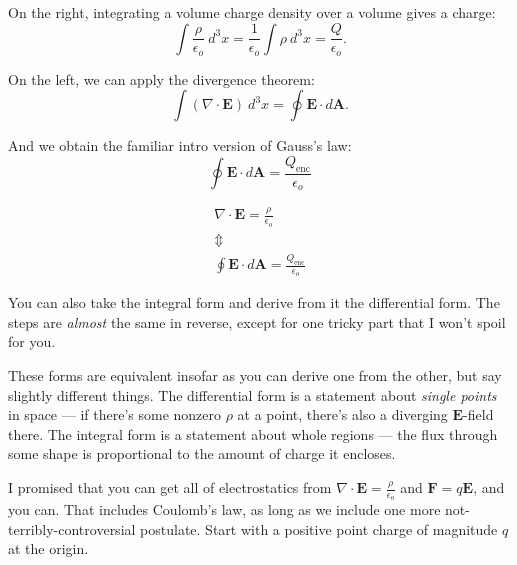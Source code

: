 \documentclass{article}
\begin{document}
On the right, integrating a volume charge density over a volume gives a charge:
\begin{equation*}
    \int \frac{\rho}{\epsilon_o}\ d^3x = \frac{1}{\epsilon_o} \int \rho\ d^3x = \frac{Q}{\epsilon_o}.
\end{equation*}

On the left, we can apply the divergence theorem:
\begin{equation*}
    \int \left( \nabla \cdot \bm{E} \right)\ d^3x = \oint \bm{E} \cdot d\bm{A}.
\end{equation*}

And we obtain the familiar intro version of Gauss's law:
\begin{equation*}
    \boxed{\oint \bm{E} \cdot d\bm{A} = \frac{Q_{\text{enc}}}{\epsilon_o}}
\end{equation*}

\begin{center}
    \parbox[c]{0.3\textwidth}{\begin{gather*} \nabla \cdot \bm{E} = \frac{\rho}{\epsilon_o} \\ \Updownarrow \\ \oint \bm{E} \cdot d\bm{A} = \frac{Q_{\text{enc}}}{\epsilon_o} \end{gather*}} \qquad\qquad \parbox[c]{0.3\textwidth}{\small You can also take the integral form and derive from it the differential form. The steps are \emph{almost} the same in reverse, except for one tricky part that I won't spoil for you.}
\end{center}

These forms are equivalent insofar as you can derive one from the other, but say slightly different things. The differential form is a statement about \emph{single points} in space --- if there's some nonzero $\rho$ at a point, there's also a diverging $\bm{E}$-field there. The integral form is a statement about whole regions --- the flux through some shape is proportional to the amount of charge it encloses.

\vspace{1em}

I promised that you can get all of electrostatics from $\nabla \cdot \bm{E} = \frac{\rho}{\epsilon_o}$ and $\bm{F} = q\bm{E}$, and you can. That includes Coulomb's law, as long as we include one more not-terribly-controversial postulate. Start with a positive point charge of magnitude $q$ at the origin.
\end{document}
